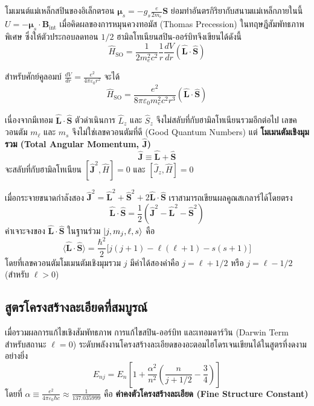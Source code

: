 โมเมนต์แม่เหล็กสปินของอิเล็กตรอน $\boldsymbol{\mu}_s = -g_s \frac{e}{2m_e}\mathbf{S}$ ย่อมทำอันตรกิริยากับสนามแม่เหล็กภายในนี้ $U = -\boldsymbol{\mu}_s \cdot \mathbf{B}_{\text{int}}$ เมื่อคิดผลของการหมุนควงทอมัส (Thomas Precession) ในทฤษฎีสัมพัทธภาพพิเศษ ซึ่งให้ตัวประกอบลดทอน $1/2$ ฮามิลโทเนียนสปิน-ออร์บิทจึงเขียนได้ดังนี้
\begin{equation}
\hat{H}_{\text{SO}} = \frac{1}{2 m_e^2 c^2} \frac{1}{r} \frac{dV}{dr} (\hat{\mathbf{L}}\cdot\hat{\mathbf{S}})
\label{eq:spin_orbit_hamiltonian}
\end{equation}

สำหรับศักย์คูลอมบ์ $\frac{dV}{dr} = \frac{e^2}{4\pi\varepsilon_0 r^2}$ จะได้
\begin{equation}
\hat{H}_{\text{SO}} = \frac{e^2}{8\pi\varepsilon_0 m_e^2 c^2 r^3} (\hat{\mathbf{L}}\cdot\hat{\mathbf{S}})
\end{equation}

เนื่องจากมีเทอม $\hat{\mathbf{L}}\cdot\hat{\mathbf{S}}$ ตัวดำเนินการ $\hat{L}_z$ และ $\hat{S}_z$ จึงไม่สลับที่กับฮามิลโทเนียนรวมอีกต่อไป เลขควอนตัม $m_\ell$ และ $m_s$ จึงไม่ใช่เลขควอนตัมที่ดี (Good Quantum Numbers) แต่ \textbf{โมเมนตัมเชิงมุมรวม (Total Angular Momentum, $\hat{\mathbf{J}}$)}
\begin{equation}
\hat{\mathbf{J}} \equiv \hat{\mathbf{L}} + \hat{\mathbf{S}}
\end{equation}
จะสลับที่กับฮามิลโทเนียน $[\hat{\mathbf{J}}^2, \hat{H}] = 0$ และ $[\hat{J}_z, \hat{H}] = 0$

เมื่อกระจายขนาดกำลังสอง $\hat{\mathbf{J}}^2 = \hat{\mathbf{L}}^2 + \hat{\mathbf{S}}^2 + 2\hat{\mathbf{L}}\cdot\hat{\mathbf{S}}$ เราสามารถเขียนผลคูณสเกลาร์ได้โดยตรง
\begin{equation}
\hat{\mathbf{L}}\cdot\hat{\mathbf{S}} = \frac{1}{2} \left( \hat{\mathbf{J}}^2 - \hat{\mathbf{L}}^2 - \hat{\mathbf{S}}^2 \right)
\label{eq:l_dot_s_formula}
\end{equation}
ค่าเจาะจงของ $\hat{\mathbf{L}}\cdot\hat{\mathbf{S}}$ ในฐานร่วม $\ket{j, m_j, \ell, s}$ คือ
\begin{equation}
\langle \hat{\mathbf{L}}\cdot\hat{\mathbf{S}} \rangle = \frac{\hbar^2}{2} \big[ j(j + 1) - \ell(\ell + 1) - s(s + 1) \big]
\end{equation}
โดยที่เลขควอนตัมโมเมนตัมเชิงมุมรวม $j$ มีค่าได้สองค่าคือ $j = \ell + 1/2$ หรือ $j = \ell - 1/2$ (สำหรับ $\ell > 0$)

\subsection{สูตรโครงสร้างละเอียดที่สมบูรณ์}
เมื่อรวมผลการแก้ไขเชิงสัมพัทธภาพ การแก้ไขสปิน-ออร์บิท และเทอมดาร์วิน (Darwin Term สำหรับสถานะ $\ell = 0$) ระดับพลังงานโครงสร้างละเอียดของอะตอมไฮโดรเจนเขียนได้ในสูตรที่งดงามอย่างยิ่ง
\begin{equation}
E_{nj} = E_n \left[ 1 + \frac{\alpha^2}{n^2} \left( \frac{n}{j + 1/2} - \frac{3}{4} \right) \right]
\label{eq:fine_structure_full_formula}
\end{equation}
โดยที่ $\alpha \equiv \frac{e^2}{4\pi\varepsilon_0 \hbar c} \approx \frac{1}{137.035999}$ คือ \textbf{ค่าคงตัวโครงสร้างละเอียด (Fine Structure Constant)}


